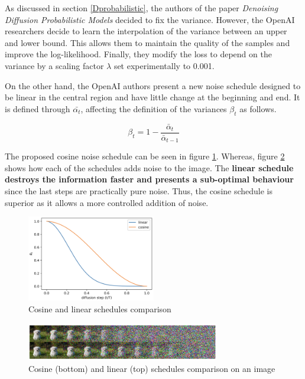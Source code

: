 As discussed in section \ref{Dprobabilistic}, the authors of the paper \textit{Denoising Diffusion Probabilistic Models} \cite{ho2020denoising} decided to fix the variance. However, the OpenAI researchers decide to learn the interpolation of the variance between an upper and lower bound. This allows them to maintain the quality of the samples and improve the log-likelihood. Finally, they modify the loss to depend on the variance by a scaling factor $\lambda$ set experimentally to 0.001.

On the other hand, the OpenAI authors present a new noise schedule designed to be linear in the central region and have little change at the beginning and end. It is defined through $ \bar{\alpha_t}$, affecting the definition of the variances $\beta_t$ as follows.

\[\beta_t = 1 - \frac{\bar{\alpha}_t}{\bar{\alpha}_{t-1}}\]

The proposed cosine noise schedule can be seen in figure \ref{fig:CosineSC}. Whereas, figure \ref{fig:CosineEX} shows how each of the schedules adds noise to the image. The \textbf{linear schedule destroys the information faster and presents a sub-optimal behaviour} since the last steps are practically pure noise. Thus, the cosine schedule is superior as it allows a more controlled addition of noise.

\begin{figure}
    \centering
    \includegraphics[width=0.5\textwidth]{Pictures/cosineSC.png} 
    \caption{Cosine and linear schedules comparison}
    \label{fig:CosineSC}
\end{figure}

\begin{figure}
    \centering
    \includegraphics[width=0.75\textwidth]{Pictures/cosineEX.png} 
    \caption{Cosine (bottom) and linear (top) schedules comparison on an image}
    \label{fig:CosineEX}
\end{figure}

